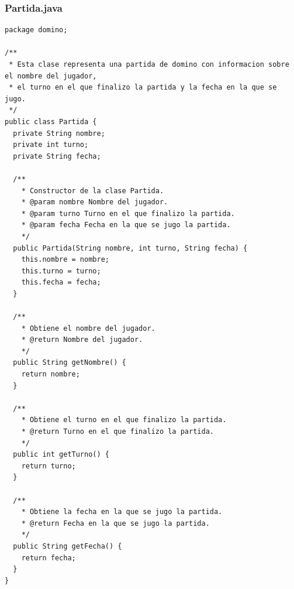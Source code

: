 \documentclass[12pt]{article}
\begin{document}
  \subsubsection{Partida.java}
  \begin{lstlisting}
package domino;

/**
 * Esta clase representa una partida de domino con informacion sobre el nombre del jugador,
 * el turno en el que finalizo la partida y la fecha en la que se jugo.
 */
public class Partida {
  private String nombre;
  private int turno;
  private String fecha;

  /**
    * Constructor de la clase Partida.
    * @param nombre Nombre del jugador.
    * @param turno Turno en el que finalizo la partida.
    * @param fecha Fecha en la que se jugo la partida.
    */
  public Partida(String nombre, int turno, String fecha) {
    this.nombre = nombre;
    this.turno = turno;
    this.fecha = fecha;
  }

  /**
    * Obtiene el nombre del jugador.
    * @return Nombre del jugador.
    */
  public String getNombre() {
    return nombre;
  }

  /**
    * Obtiene el turno en el que finalizo la partida.
    * @return Turno en el que finalizo la partida.
    */
  public int getTurno() {
    return turno;
  }

  /**
    * Obtiene la fecha en la que se jugo la partida.
    * @return Fecha en la que se jugo la partida.
    */
  public String getFecha() {
    return fecha;
  }
}
  \end{lstlisting}
\end{document}
